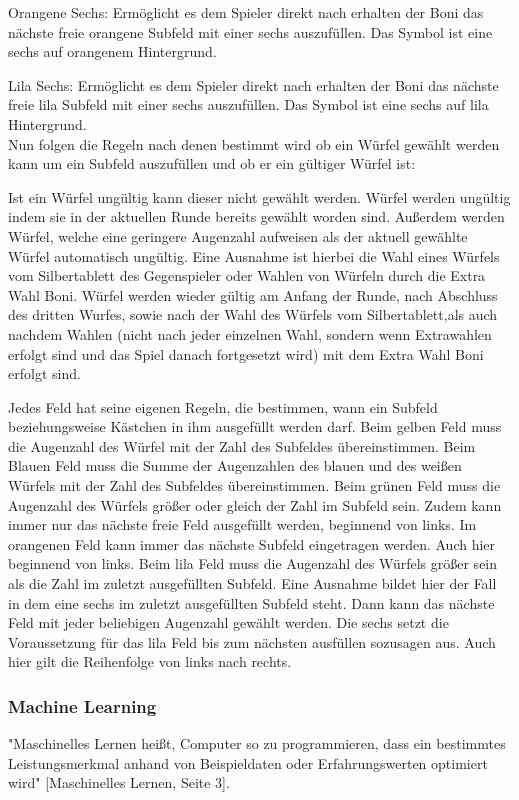Orangene Sechs: Ermöglicht es dem Spieler direkt nach erhalten der Boni das nächste freie orangene Subfeld mit einer sechs auszufüllen. Das Symbol ist eine sechs auf orangenem Hintergrund.

Lila Sechs: Ermöglicht es dem Spieler direkt nach erhalten der Boni das nächste freie lila Subfeld mit einer sechs auszufüllen. Das Symbol ist eine sechs auf lila Hintergrund. \\

Nun folgen die Regeln nach denen bestimmt wird ob ein Würfel gewählt werden kann um ein Subfeld auszufüllen und ob er ein gültiger Würfel ist:

Ist ein Würfel ungültig kann dieser nicht gewählt werden. Würfel werden ungültig indem sie in der aktuellen Runde bereits gewählt worden sind. Außerdem werden Würfel, welche eine geringere Augenzahl aufweisen als der aktuell gewählte Würfel automatisch ungültig. Eine Ausnahme ist hierbei die Wahl eines Würfels vom Silbertablett des Gegenspieler oder Wahlen von Würfeln durch die Extra Wahl Boni. Würfel werden wieder gültig am Anfang der Runde, nach Abschluss des dritten Wurfes, sowie nach der Wahl des Würfels vom Silbertablett,als auch nachdem Wahlen (nicht nach jeder einzelnen Wahl, sondern wenn Extrawahlen erfolgt sind und das Spiel danach fortgesetzt wird) mit dem Extra Wahl Boni erfolgt sind.

Jedes Feld hat seine eigenen Regeln, die bestimmen, wann ein Subfeld beziehungsweise Kästchen in ihm ausgefüllt werden darf. Beim gelben Feld muss die Augenzahl des Würfel mit der Zahl des Subfeldes übereinstimmen. Beim Blauen Feld muss die Summe der Augenzahlen des blauen und des weißen Würfels mit der Zahl des Subfeldes übereinstimmen. Beim grünen Feld muss die Augenzahl des Würfels größer oder gleich der Zahl im Subfeld sein. Zudem kann immer nur das nächste freie Feld ausgefüllt werden, beginnend von links. Im orangenen Feld kann immer das nächste Subfeld eingetragen werden. Auch hier beginnend von links. Beim lila Feld muss die Augenzahl des Würfels größer sein als die Zahl im zuletzt ausgefüllten Subfeld. Eine Ausnahme bildet hier der Fall in dem eine sechs im zuletzt ausgefüllten Subfeld steht. Dann kann das nächste Feld mit jeder beliebigen Augenzahl gewählt werden. Die sechs setzt die Voraussetzung für das lila Feld bis zum nächsten ausfüllen sozusagen aus. Auch hier gilt die Reihenfolge von links nach rechts.
\subsubsection{Machine Learning}
"Maschinelles Lernen heißt, Computer so zu programmieren, dass ein bestimmtes Leistungsmerkmal anhand von Beispieldaten oder Erfahrungswerten optimiert wird" [Maschinelles Lernen, Seite 3].

